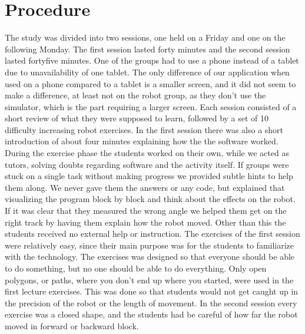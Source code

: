 \section{Procedure}
The study was divided into two sessions, one held on a Friday and one on the following Monday. The first session lasted forty minutes and the second session lasted fortyfive minutes. 
One of the groups had to use a phone instead of a tablet due to unavailability of one tablet. 
The only difference of our application when used on a phone compared to a tablet is a smaller screen, and it did not seem to make a difference, at least not on the robot group, as they don't use the simulator, which is the part requiring a larger screen. Each session consisted of a short review of what they were supposed to learn, followed by a set of 10 difficulty increasing robot exercises. In the first session there was also a short introduction of about four minutes explaining how the the software worked. During the exercise phase the students worked on their own, while we acted as tutors, solving doubts regarding software and the activity itself. If groups were stuck on a single task without making progress we provided subtle hints to help them along. 
We never gave them the answers or any code, but explained that visualizing the program block by block and think about the effects on the robot. If it was clear that they measured the wrong angle we helped them get on the right track by having them explain how the robot moved. 
Other than this the students received no external help or instruction. The exercises of the first session were relatively easy, since their main purpose was for the students to familiarize with the technology. The exercises was designed so that everyone should be able to do something, but no one should be able to do everything. Only open polygons, or paths, where you don't end up where you started, were used in the first lecture exercises. This was done so that students would not get caught up in the precision of the robot or the length of movement. In the second session every exercise was a closed shape, and the students had be careful of how far the robot moved in forward or backward block.  


